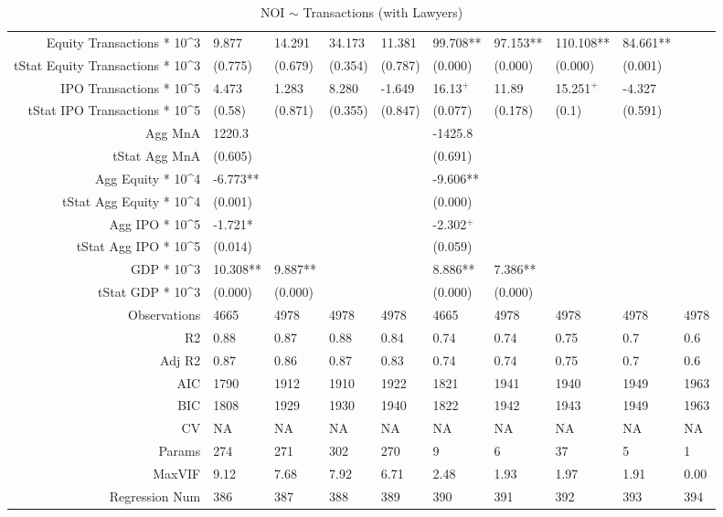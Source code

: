 \begin{table}[ht]
\begin{tabular}{rlllllllll}
  Equity Transactions * 10^3 & 9.877 & 14.291 & 34.173 & 11.381 & 99.708** & 97.153** & 110.108** & 84.661** &  \\ 
  tStat Equity Transactions * 10^3 & (0.775) & (0.679) & (0.354) & (0.787) & (0.000) & (0.000) & (0.000) & (0.001) &  \\ 
  IPO Transactions * 10^5 & 4.473 & 1.283 & 8.280 & -1.649 & 16.13$^{+}$ & 11.89 & 15.251$^{+}$ & -4.327 &  \\ 
  tStat IPO Transactions * 10^5 & (0.58) & (0.871) & (0.355) & (0.847) & (0.077) & (0.178) & (0.1) & (0.591) &  \\ 
  Agg MnA & 1220.3 &  &  &  & -1425.8 &  &  &  &  \\ 
  tStat Agg MnA & (0.605) &  &  &  & (0.691) &  &  &  &  \\ 
  Agg Equity * 10^4 & -6.773** &  &  &  & -9.606** &  &  &  &  \\ 
  tStat Agg Equity * 10^4 & (0.001) &  &  &  & (0.000) &  &  &  &  \\ 
  Agg IPO * 10^5 & -1.721* &  &  &  & -2.302$^{+}$ &  &  &  &  \\ 
  tStat Agg IPO * 10^5 & (0.014) &  &  &  & (0.059) &  &  &  &  \\ 
  GDP * 10^3 & 10.308** & 9.887** &  &  & 8.886** & 7.386** &  &  &  \\ 
  tStat GDP * 10^3 & (0.000) & (0.000) &  &  & (0.000) & (0.000) &  &  &  \\ 
  Observations & 4665 & 4978 & 4978 & 4978 & 4665 & 4978 & 4978 & 4978 & 4978 \\ 
  R2 & 0.88 & 0.87 & 0.88 & 0.84 & 0.74 & 0.74 & 0.75 & 0.7 & 0.6 \\ 
  Adj R2 & 0.87 & 0.86 & 0.87 & 0.83 & 0.74 & 0.74 & 0.75 & 0.7 & 0.6 \\ 
  AIC & 1790 & 1912 & 1910 & 1922 & 1821 & 1941 & 1940 & 1949 & 1963 \\ 
  BIC & 1808 & 1929 & 1930 & 1940 & 1822 & 1942 & 1943 & 1949 & 1963 \\ 
  CV & NA & NA & NA & NA & NA & NA & NA & NA & NA \\ 
  Params & 274 & 271 & 302 & 270 & 9 & 6 & 37 & 5 & 1 \\ 
  MaxVIF & 9.12 & 7.68 & 7.92 & 6.71 & 2.48 & 1.93 & 1.97 & 1.91 & 0.00 \\ 
  Regression Num & 386 & 387 & 388 & 389 & 390 & 391 & 392 & 393 & 394 \\ 
   \hline
\end{tabular}
\caption{NOI $\sim$ Transactions (with Lawyers)} 
\end{table}
